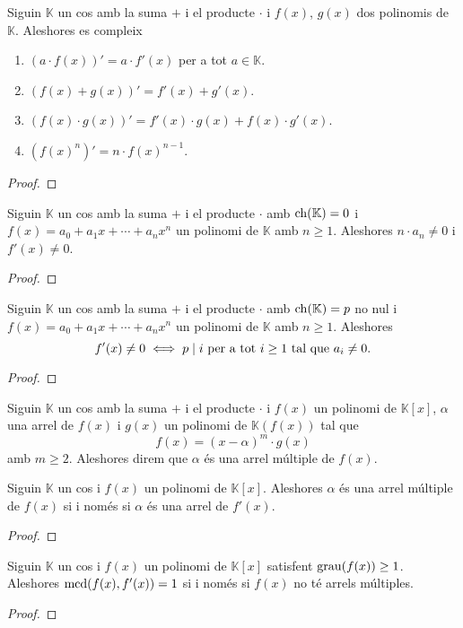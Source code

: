 \documentclass[../../Main.tex]{subfiles}
\begin{document}
	\begin{proposition}
		\label{prop:propietats de la derivada formal}
		Siguin \(\mathbb{K}\) un cos amb la suma \(+\) i el producte \(\cdot\) i \(f(x)\), \(g(x)\) dos polinomis de \(\mathbb{K}\). Aleshores es compleix
		\begin{enumerate}
			\item \((a\cdot f(x))'=a\cdot f'(x)\) per a tot \(a\in\mathbb{K}\).
			\item \((f(x)+g(x))'=f'(x)+g'(x)\).
			\item \((f(x)\cdot g(x))'=f'(x)\cdot g(x)+f(x)\cdot g'(x)\).
			\item \({(f(x)^{n})}'=n\cdot f(x)^{n-1}\).
		\end{enumerate}
		\begin{proof}
		\end{proof}
	\end{proposition}
	\begin{proposition}
		Siguin \(\mathbb{K}\) un cos amb la suma \(+\) i el producte \(\cdot\) amb \(\operatorname{ch}(\mathbb{K})=0\) i \(f(x)=a_{0}+a_{1}x+\cdots+a_{n}x^{n}\) un polinomi de \(\mathbb{K}\) amb \(n\geq1\). Aleshores \(n\cdot a_{n}\neq0\) i \(f'(x)\neq0\).
		\begin{proof}
		\end{proof}
	\end{proposition}
	\begin{proposition}
		Siguin \(\mathbb{K}\) un cos amb la suma \(+\) i el producte \(\cdot\) amb \(\operatorname{ch}(\mathbb{K})=p\) no nul i \(f(x)=a_{0}+a_{1}x+\cdots+a_{n}x^{n}\) un polinomi de \(\mathbb{K}\) amb \(n\geq1\). Aleshores
		\[f'(x)\neq0\iff p\mathrel{|} i\text{ per a tot }i\geq1\text{ tal que }a_{i}\neq0.\]
		\begin{proof}
		\end{proof}
	\end{proposition}
	\begin{definition}
		\label{def:arrel múltiple}
		Siguin \(\mathbb{K}\) un cos amb la suma \(+\) i el producte \(\cdot\) i \(f(x)\) un polinomi de \(\mathbb{K}[x]\), \(\alpha\) una arrel de \(f(x)\) i \(g(x)\) un polinomi de \(\mathbb{K}(f(x))\) tal que 
		\[f(x)=(x-\alpha)^{m}\cdot g(x)\]
		amb \(m\geq2\). Aleshores direm que \(\alpha\) és una arrel múltiple de \(f(x)\).
	\end{definition}
	\begin{proposition}
		Siguin \(\mathbb{K}\) un cos i \(f(x)\) un polinomi de \(\mathbb{K}[x]\). Aleshores \(\alpha\) és una arrel múltiple de \(f(x)\) si i només si \(\alpha\) és una arrel de \(f'(x)\).
		\begin{proof}
		\end{proof}
	\end{proposition}
	\begin{corollary}
		Siguin \(\mathbb{K}\) un cos i \(f(x)\) un polinomi de \(\mathbb{K}[x]\) satisfent \(\operatorname{grau}(f(x))\geq1\). Aleshores \(\operatorname{mcd}(f(x),f'(x))=1\) si i només si \(f(x)\) no té arrels múltiples.
		\begin{proof}
		\end{proof}
	\end{corollary}
\end{document}
